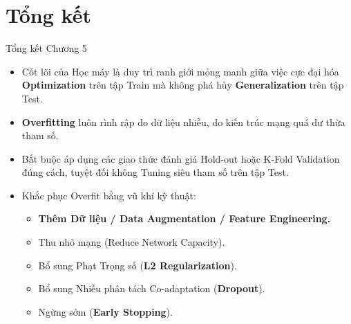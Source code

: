 \documentclass[aspectratio=169]{beamer}
\begin{document}
\section{Tổng kết}

\begin{frame}{Tổng kết Chương 5}
    \begin{itemize}
        \item Cốt lõi của Học máy là duy trì ranh giới mỏng manh giữa việc cực đại hóa \textbf{Optimization} trên tập Train mà không phá hủy \textbf{Generalization} trên tập Test.
        \item \textbf{Overfitting} luôn rình rập do dữ liệu nhiễu, do kiến trúc mạng quá dư thừa tham số.
        \item Bắt buộc áp dụng các giao thức đánh giá Hold-out hoặc K-Fold Validation đúng cách, tuyệt đối không Tuning siêu tham số trên tập Test.
        \item Khắc phục Overfit bằng vũ khí kỹ thuật:
        \begin{itemize}
            \item \textbf{Thêm Dữ liệu / Data Augmentation / Feature Engineering.}
            \item Thu nhỏ mạng (Reduce Network Capacity).
            \item Bổ sung Phạt Trọng số (\textbf{L2 Regularization}).
            \item Bổ sung Nhiễu phân tách Co-adaptation (\textbf{Dropout}).
            \item Ngừng sớm (\textbf{Early Stopping}).
        \end{itemize}
    \end{itemize}
\end{frame}
\end{document}
